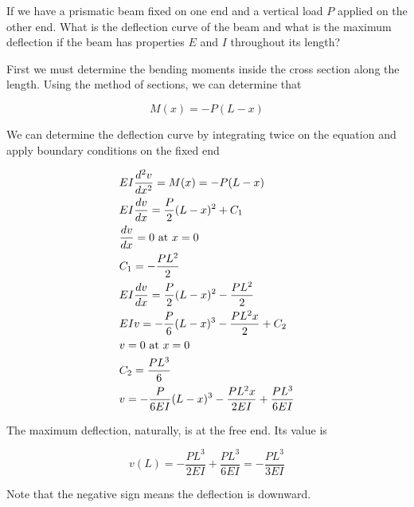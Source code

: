\documentclass[
10pt,
a4paper,
openany,
svgnames,
]{book}
\begin{document}
\begin{example}
  If we have a prismatic beam fixed on one end and a vertical load $P$ applied on the other end. What is the deflection curve of the beam and what is the maximum deflection if the beam has properties $E$ and $I$ throughout its length?

  \begin{figure}[H]
    \centering
  \end{figure}
  
\end{example}
\begin{solution}
First we must determine the bending moments inside the cross section along the length. Using the method of sections, we can determine that

\[M(x) =  - P(L - x)\]	

We can determine the deflection curve by integrating twice on the equation and apply boundary conditions on the fixed end

\[\begin{gathered}
  EI\frac{d^2v}{dx^2} = M(x) =  - P(L - x) \hfill \\
  EI\frac{dv}{dx} = \frac{P}{2}(L - x)^2 + C_1 \hfill \\
  \frac{dv}{dx} = 0\text{ at }x = 0 \hfill \\
  C_1 =  -\frac{PL^2}{2} \hfill \\
  EI\frac{dv}{dx} = \frac{P}{2}(L - x)^2 - \frac{PL^2}{2} \hfill \\
  EIv =  -\frac{P}{6}(L - x)^3 -\frac{PL^2x}{2} + C_2 \hfill \\
  v = 0\text{ at }x = 0 \hfill \\
  C_2 = \frac{PL^3}{6} \hfill \\
  v =  -\frac{P}{6EI}(L - x)^3 -\frac{PL^2x}{2EI} + \frac{PL^3}{6EI} \hfill \\ 
\end{gathered} \]

The maximum deflection, naturally, is at the free end. Its value is

\[v(L) =  - \frac{PL^3}{2EI} + \frac{PL^3}{6EI} =  - \frac{PL^3}{3EI}\]

Note that the negative sign means the deflection is downward.
\end{solution}
\end{document}
